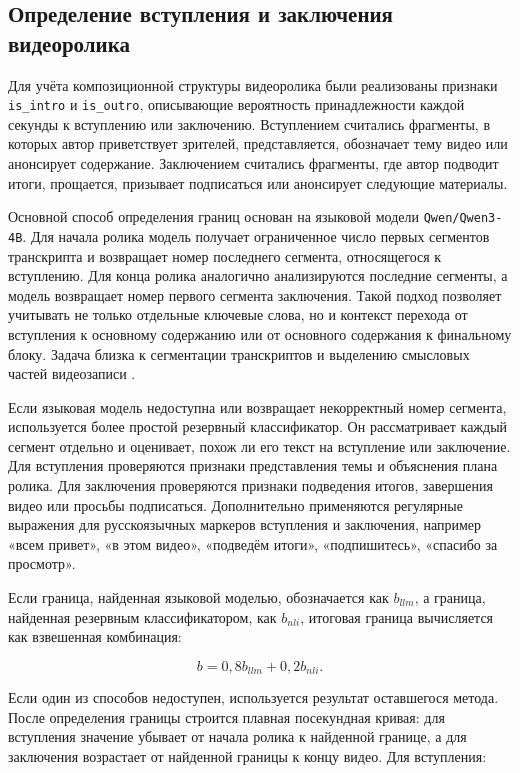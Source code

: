 \documentclass[times]{itmo-student-thesis}
\begin{document}
\subsection{Определение вступления и заключения видеоролика}

Для учёта композиционной структуры видеоролика были реализованы признаки \texttt{is\_intro} и \texttt{is\_outro}, описывающие вероятность принадлежности каждой секунды к вступлению или заключению. Вступлением считались фрагменты, в которых автор приветствует зрителей, представляется, обозначает тему видео или анонсирует содержание. Заключением считались фрагменты, где автор подводит итоги, прощается, призывает подписаться или анонсирует следующие материалы.

Основной способ определения границ основан на языковой модели \texttt{Qwen/Qwen3-4B}. Для начала ролика модель получает ограниченное число первых сегментов транскрипта и возвращает номер последнего сегмента, относящегося к вступлению. Для конца ролика аналогично анализируются последние сегменты, а модель возвращает номер первого сегмента заключения. Такой подход позволяет учитывать не только отдельные ключевые слова, но и контекст перехода от вступления к основному содержанию или от основного содержания к финальному блоку. Задача близка к сегментации транскриптов и выделению смысловых частей видеозаписи \cite{retkowski2024smartchaptering}.

Если языковая модель недоступна или возвращает некорректный номер сегмента, используется более простой резервный классификатор. Он рассматривает каждый сегмент отдельно и оценивает, похож ли его текст на вступление или заключение. Для вступления проверяются признаки представления темы и объяснения плана ролика. Для заключения проверяются признаки подведения итогов, завершения видео или просьбы подписаться. Дополнительно применяются регулярные выражения для русскоязычных маркеров вступления и заключения, например «всем привет», «в этом видео», «подведём итоги», «подпишитесь», «спасибо за просмотр».

Если граница, найденная языковой моделью, обозначается как $b_{llm}$, а граница, найденная резервным классификатором, как $b_{nli}$, итоговая граница вычисляется как взвешенная комбинация:

\[
b=0{,}8b_{llm}+0{,}2b_{nli}.
\]

Если один из способов недоступен, используется результат оставшегося метода. После определения границы строится плавная посекундная кривая: для вступления значение убывает от начала ролика к найденной границе, а для заключения возрастает от найденной границы к концу видео. Для вступления:
\end{document}

